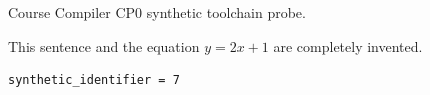 \documentclass[11pt,a4paper]{article}
\begin{document}
Course Compiler CP0 synthetic toolchain probe.

This sentence and the equation \(y = 2x + 1\) are completely invented.

\begin{Verbatim}
synthetic_identifier = 7
\end{Verbatim}
\end{document}
